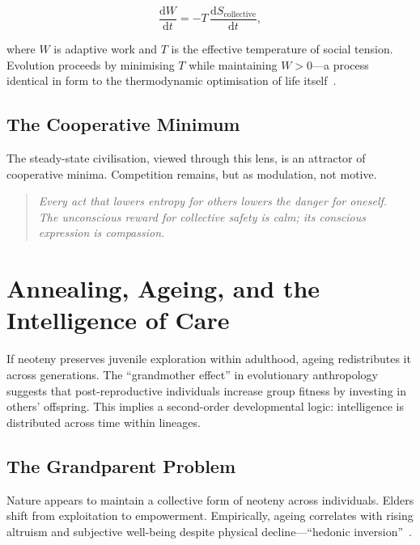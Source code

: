 \documentclass[12pt,a4paper]{article}
\theoremstyle{definition}
\newcommand{\ddt}[1]{\frac{\mathrm{d}#1}{\mathrm{d}t}}
\begin{document}
\begin{equation}
  \ddt{W} = -T\,\ddt{S_{\mathrm{collective}}},
\end{equation}

where $W$ is adaptive work and $T$ is the effective temperature of social
tension.  Evolution proceeds by minimising $T$ while maintaining $W > 0$---a
process identical in form to the thermodynamic optimisation of
life itself~\citep{dalziel2022,friston2023}.

\subsection{The Cooperative Minimum}

The steady-state civilisation, viewed through this lens, is an attractor of
cooperative minima.  Competition remains, but as modulation, not motive.

\begin{quote}
  \itshape
  Every act that lowers entropy for others lowers the danger for oneself.\\
  The unconscious reward for collective safety is calm; its conscious
  expression is compassion.
\end{quote}

\section{Annealing, Ageing, and the Intelligence of Care}
\label{sec:annealing}

If neoteny preserves juvenile exploration within adulthood, ageing redistributes
it across generations.  The ``grandmother effect'' in evolutionary anthropology
suggests that post-reproductive individuals increase group fitness by investing
in others' offspring.  This implies a second-order developmental logic:
intelligence is distributed across time within lineages.

\subsection{The Grandparent Problem}

Nature appears to maintain a collective form of neoteny across individuals.
Elders shift from exploitation to empowerment.  Empirically, ageing correlates
with rising altruism and subjective well-being despite physical
decline---``hedonic inversion''~\citep{carstensen2011}.
\end{document}
